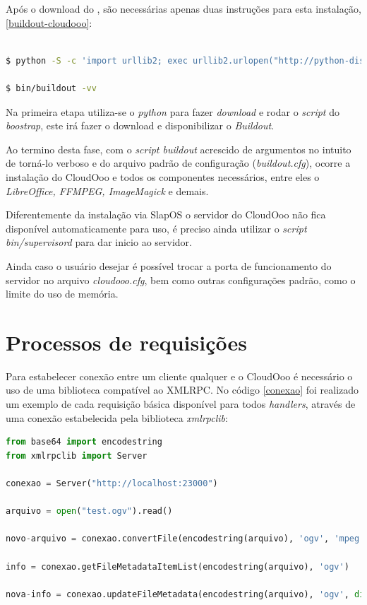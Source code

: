 Após o download do \cite{BUILD-CLOUDOOO}, são necessárias apenas duas instruções para esta instalação, \ref{buildout-cloudooo}:

{\singlespace
\begin{lstlisting}[caption=Modo de instalação do cloudOoo \cite{BUILD-CLOUDOOO},language=bash,label={buildout-cloudooo}]

$ python -S -c 'import urllib2; exec urllib2.urlopen("http://python-distribute.org/boostrap.py").read()'

$ bin/buildout -vv

\end{lstlisting}
}

Na primeira etapa utiliza-se o \textit{python} para fazer \textit{download} e rodar o \textit{script} do \textit{boostrap}, este irá fazer o download e disponibilizar o \textit{Buildout}. 

Ao termino desta fase, com o \textit{script buildout} acrescido de argumentos no intuito de torná-lo verboso e do arquivo padrão de configuração (\textit{buildout.cfg}), ocorre a instalação do CloudOoo e todos os componentes necessários, entre eles o \textit{LibreOffice, FFMPEG, ImageMagick} e demais.

Diferentemente da instalação via SlapOS o servidor do CloudOoo não fica disponível automaticamente para uso, é preciso ainda utilizar o \textit{script bin/supervisord} para dar inicio ao servidor.

Ainda caso o usuário desejar é possível trocar a porta de funcionamento do servidor no arquivo \textit{cloudooo.cfg}, bem como outras configurações padrão, como o limite do uso de memória.


\section{Processos de requisições}

Para estabelecer conexão entre um cliente qualquer e o CloudOoo é necessário o uso de uma biblioteca compatível ao XMLRPC. No código \ref{conexao} foi realizado um exemplo de cada requisição básica disponível para todos \textit{handlers}, através de uma conexão estabelecida pela biblioteca \textit{xmlrpclib}:

{\singlespace
\begin{lstlisting}[caption=Exemplo prático de uso do CloudOoo,language=python,label={conexao}]
from base64 import encodestring
from xmlrpclib import Server

conexao = Server("http://localhost:23000")

arquivo = open("test.ogv").read()

novo-arquivo = conexao.convertFile(encodestring(arquivo), 'ogv', 'mpeg')

info = conexao.getFileMetadataItemList(encodestring(arquivo), 'ogv')

nova-info = conexao.updateFileMetadata(encodestring(arquivo), 'ogv', dict(Titulo="Arquivo teste"))

\end{lstlisting}
}

